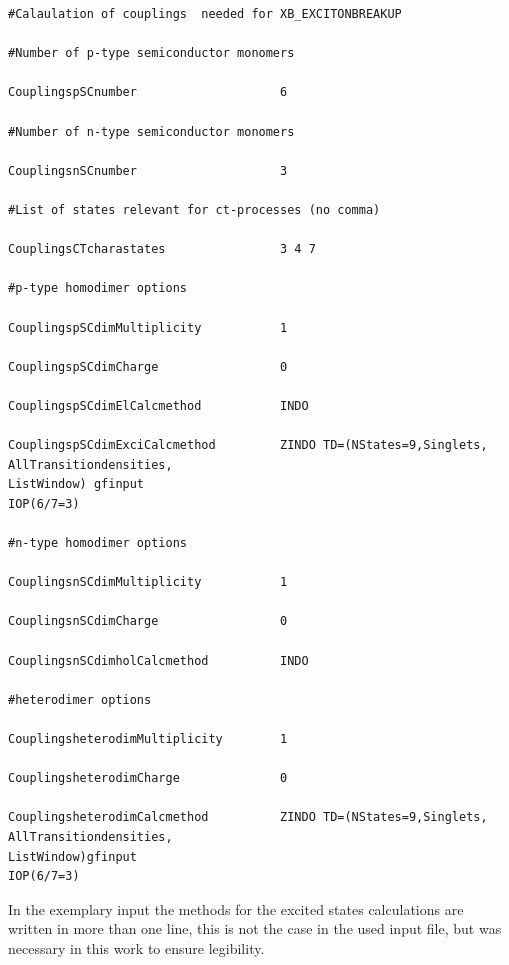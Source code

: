 \documentclass[10pt,a4paper]{article} %
\begin{document}
\begin{lstlisting}
#Calaulation of couplings  needed for XB_EXCITONBREAKUP

#Number of p-type semiconductor monomers

CouplingspSCnumber                    6

#Number of n-type semiconductor monomers        

CouplingsnSCnumber                    3 

#List of states relevant for ct-processes (no comma)

CouplingsCTcharastates                3 4 7

#p-type homodimer options

CouplingspSCdimMultiplicity           1  

CouplingspSCdimCharge                 0  

CouplingspSCdimElCalcmethod           INDO 

CouplingspSCdimExciCalcmethod         ZINDO TD=(NStates=9,Singlets,  													 		   AllTransitiondensities,															 					ListWindow) gfinput 																					IOP(6/7=3) 

#n-type homodimer options

CouplingsnSCdimMultiplicity           1 

CouplingsnSCdimCharge                 0 

CouplingsnSCdimholCalcmethod          INDO 

#heterodimer options

CouplingsheterodimMultiplicity        1 

CouplingsheterodimCharge              0 

CouplingsheterodimCalcmethod          ZINDO TD=(NStates=9,Singlets, 																 AllTransitiondensities, 																			  ListWindow)gfinput 																					  IOP(6/7=3) 
\end{lstlisting}
In the exemplary input the methods for the excited states calculations are written in more than one line, this is not the case in the used input file, but was necessary in this work to ensure legibility. \\
\end{document}
